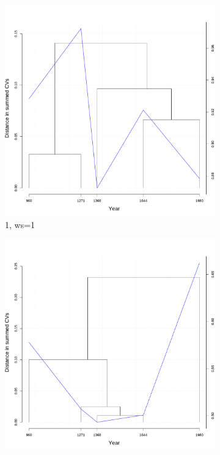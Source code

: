 \newpage
\begin{figure}[H]
  \begin{subfigure}{0.3\textwidth}
    \includegraphics[width=\linewidth]{figures_new/measures/VNC_measure_dist_w1_first_embed.pdf}
    \caption*{1\sts  , ws=1}
  \end{subfigure}
  \quad
  \begin{subfigure}{0.3\textwidth}
    \includegraphics[width=\linewidth]{figures_new/measures/VNC_measure_dist_w1_second_embed_global.pdf}

\end{subfigure}
\end{figure}
